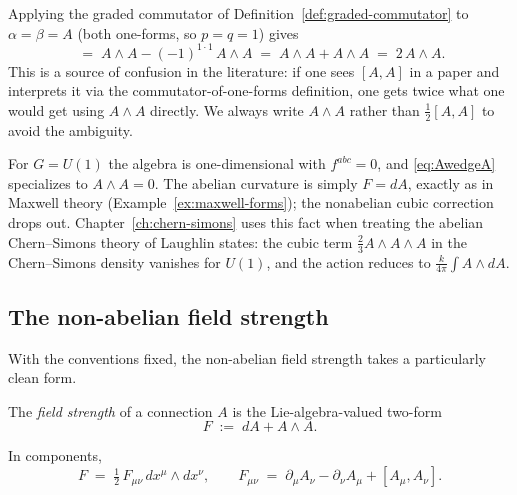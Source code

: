 \begin{remark}\label{rem:AwedgeA-factor}
Applying the graded commutator of Definition~\ref{def:graded-commutator} to $\alpha = \beta = A$ (both one-forms, so $p = q = 1$) gives
\begin{equation*}
[A, A] \;=\; A \wedge A - (-1)^{1\cdot 1}\, A \wedge A \;=\; A\wedge A + A\wedge A \;=\; 2\, A \wedge A.
\end{equation*}
This is a source of confusion in the literature: if one sees $[A, A]$ in a paper and interprets it via the commutator-of-one-forms definition, one gets twice what one would get using $A \wedge A$ directly. We always write $A \wedge A$ rather than $\tfrac{1}{2}[A, A]$ to avoid the ambiguity.
\end{remark}

\begin{remark}\label{rem:abelian-case}
For $G = U(1)$ the algebra is one-dimensional with $f^{abc} = 0$, and \eqref{eq:AwedgeA} specializes to $A \wedge A = 0$. The abelian curvature is simply $F = dA$, exactly as in Maxwell theory (Example~\ref{ex:maxwell-forms}); the nonabelian cubic correction drops out. Chapter~\ref{ch:chern-simons} uses this fact when treating the abelian Chern--Simons theory of Laughlin states: the cubic term $\tfrac{2}{3}A\wedge A\wedge A$ in the Chern--Simons density vanishes for $U(1)$, and the action reduces to $\frac{k}{4\pi}\int A\wedge dA$.
\end{remark}

\subsection{The non-abelian field strength}

With the conventions fixed, the non-abelian field strength takes a particularly clean form.

\begin{definition}\label{def:F-nonabelian}
The \emph{field strength} of a connection $A$ is the Lie-algebra-valued two-form
\begin{equation}\label{eq:F-nonabelian-def}
F \;:=\; dA + A \wedge A.
\end{equation}
\end{definition}

\begin{proposition}\label{prop:F-components}
In components,
\begin{equation}\label{eq:F-nonabelian-components}
F \;=\; \tfrac{1}{2}\,F_{\mu\nu}\, dx^\mu \wedge dx^\nu,
\qquad
F_{\mu\nu} \;=\; \partial_\mu A_\nu - \partial_\nu A_\mu + [A_\mu, A_\nu].
\end{equation}
\end{proposition}

